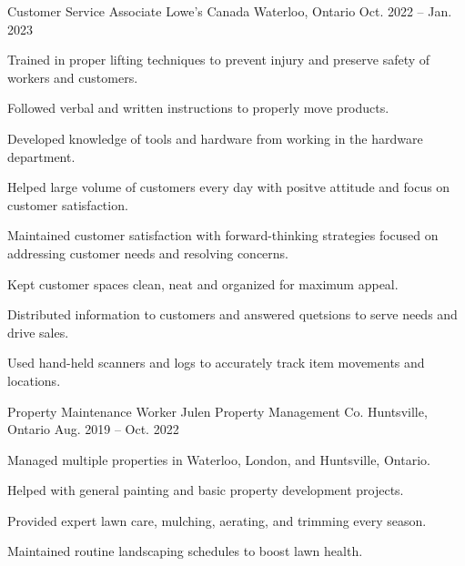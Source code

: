 \begin{cventries}
  \cventry
    {Customer Service Associate} %
    {Lowe's Canada} %
    {Waterloo, Ontario} %
    {Oct. 2022 -- Jan. 2023} %
    {
      \begin{cvitems} %
        \item {Trained in proper lifting techniques to prevent injury and preserve safety of workers and customers.}
        \item {Followed verbal and written instructions to properly move products.}
        \item {Developed knowledge of tools and hardware from working in the hardware department.}
        \item {Helped large volume of customers every day with positve attitude and focus on customer satisfaction.}
        \item {Maintained customer satisfaction with forward-thinking strategies focused on addressing customer needs and resolving concerns.}
        \item {Kept customer spaces clean, neat and organized for maximum appeal.}
        \item {Distributed information to customers and answered quetsions to serve needs and drive sales.}
        \item {Used hand-held scanners and logs to accurately track item movements and locations.}
      \end{cvitems}
    }
  \cventry
    {Property Maintenance Worker} %
    {Julen Property Management Co.} %
    {Huntsville, Ontario} %
    {Aug. 2019 -- Oct. 2022} %
    {
      \begin{cvitems} %
        \item {Managed multiple properties in Waterloo, London, and Huntsville, Ontario.}
        \item {Helped with general painting and basic property development projects.}
        \item {Provided expert lawn care, mulching, aerating, and trimming every season.}
        \item {Maintained routine landscaping schedules to boost lawn health.}

\end{cvitems}}
\end{cventries}
